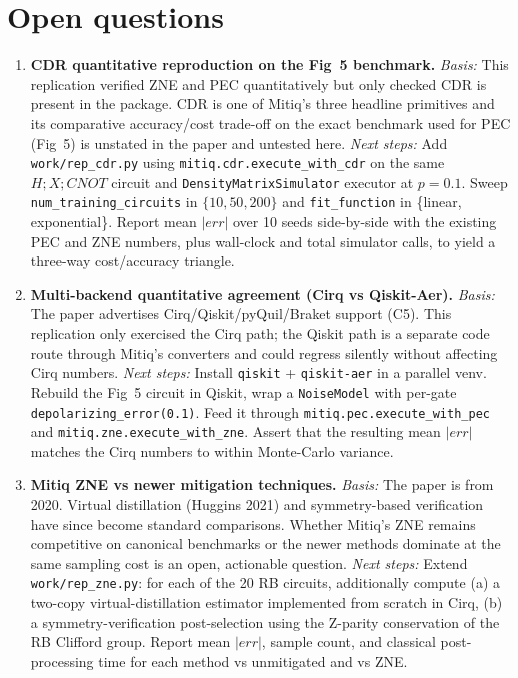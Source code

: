 \section{Open questions}

\begin{enumerate}

\item \textbf{CDR quantitative reproduction on the Fig~5 benchmark.}
\emph{Basis:} This replication verified ZNE and PEC quantitatively but only checked CDR is present in the package. CDR is one of Mitiq's three headline primitives and its comparative accuracy/cost trade-off on the exact benchmark used for PEC (Fig~5) is unstated in the paper and untested here.
\emph{Next steps:} Add \texttt{work/rep\_cdr.py} using \texttt{mitiq.cdr.execute\_with\_cdr} on the same $H;X;CNOT$ circuit and \texttt{DensityMatrixSimulator} executor at $p=0.1$. Sweep \texttt{num\_training\_circuits} in $\{10, 50, 200\}$ and \texttt{fit\_function} in \{linear, exponential\}. Report mean $|err|$ over 10 seeds side-by-side with the existing PEC and ZNE numbers, plus wall-clock and total simulator calls, to yield a three-way cost/accuracy triangle.

\item \textbf{Multi-backend quantitative agreement (Cirq vs Qiskit-Aer).}
\emph{Basis:} The paper advertises Cirq/Qiskit/pyQuil/Braket support (C5). This replication only exercised the Cirq path; the Qiskit path is a separate code route through Mitiq's converters and could regress silently without affecting Cirq numbers.
\emph{Next steps:} Install \texttt{qiskit} + \texttt{qiskit-aer} in a parallel venv. Rebuild the Fig~5 circuit in Qiskit, wrap a \texttt{NoiseModel} with per-gate \texttt{depolarizing\_error(0.1)}. Feed it through \texttt{mitiq.pec.execute\_with\_pec} and \texttt{mitiq.zne.execute\_with\_zne}. Assert that the resulting mean $|err|$ matches the Cirq numbers to within Monte-Carlo variance.

\item \textbf{Mitiq ZNE vs newer mitigation techniques.}
\emph{Basis:} The paper is from 2020. Virtual distillation (Huggins 2021) and symmetry-based verification have since become standard comparisons. Whether Mitiq's ZNE remains competitive on canonical benchmarks or the newer methods dominate at the same sampling cost is an open, actionable question.
\emph{Next steps:} Extend \texttt{work/rep\_zne.py}: for each of the 20 RB circuits, additionally compute (a) a two-copy virtual-distillation estimator implemented from scratch in Cirq, (b) a symmetry-verification post-selection using the Z-parity conservation of the RB Clifford group. Report mean $|err|$, sample count, and classical post-processing time for each method vs unmitigated and vs ZNE.


\end{enumerate}
